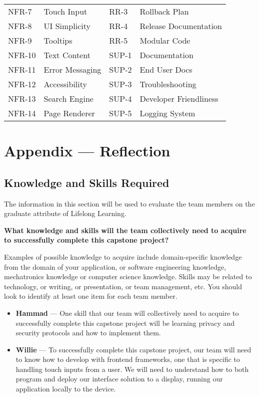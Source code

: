 \documentclass[12pt]{article}
\begin{document}
\begin{portrait}
\begin{table}[H]
\begin{adjustbox}{max width=\linewidth}
\begin{tabular}{|l|l||l|l|}
NFR-7 & Touch Input & RR-3 & Rollback Plan \\
NFR-8 & UI Simplicity & RR-4 & Release Documentation \\
NFR-9 & Tooltips & RR-5 & Modular Code \\
NFR-10 & Text Content & SUP-1 & Documentation \\
NFR-11 & Error Messaging & SUP-2 & End User Docs \\
NFR-12 & Accessibility & SUP-3 & Troubleshooting \\
NFR-13 & Search Engine & SUP-4 & Developer Friendliness \\
NFR-14 & Page Renderer & SUP-5 & Logging System \\
\hline
\end{tabular}
\end{adjustbox}
\end{table}

\restoregeometry

\section*{Appendix — Reflection}

\subsection*{Knowledge and Skills Required}

The information in this section will be used to evaluate the team members on the graduate attribute of Lifelong Learning.

\textbf{What knowledge and skills will the team collectively need to acquire to successfully complete this capstone project?}

Examples of possible knowledge to acquire include domain-specific knowledge from the domain of your application, or software engineering knowledge, mechatronics knowledge or computer science knowledge. Skills may be related to technology, or writing, or presentation, or team management, etc. You should look to identify at least one item for each team member.

\begin{itemize}
    \item \textbf{Hammad} — One skill that our team will collectively need to acquire to successfully complete this capstone project will be learning privacy and security protocols and how to implement them.
    
    \item \textbf{Willie} — To successfully complete this capstone project, our team will need to know how to develop with frontend frameworks, one that is specific to handling touch inputs from a user. We will need to understand how to both program and deploy our interface solution to a display, running our application locally to the device.
    

\end{itemize}
\end{portrait}
\end{document}
